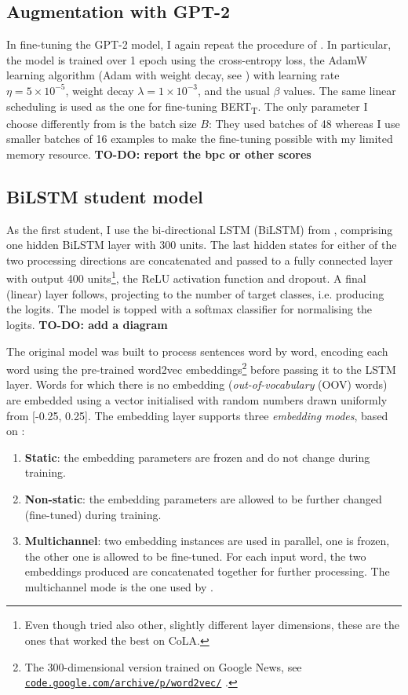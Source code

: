 \documentclass[bsc,frontabs,twoside,singlespacing,parskip,deptreport]{infthesis}
\def\BERTT{BERT\textsubscript{T}}
\newcommand\rurl[1]{%
  \href{https://#1}{\nolinkurl{#1}}%
}
\begin{document}
{{    %
    \subsection{Augmentation with GPT-2}{
      In fine-tuning the GPT-2 model, I again repeat the procedure of \citeauthor{Tang_2019b}. In particular, the model is trained over 1 epoch using the cross-entropy loss, the AdamW learning algorithm (Adam with weight decay, see \citet{Loshchilov_2019}) with learning rate $\eta=5\times10^{-5}$, weight decay $\lambda=1\times10^{-3}$, and the usual $\beta$ values. The same linear scheduling is used as the one for fine-tuning \BERTT. The only parameter I choose differently from \citeauthor{Tang_2019b} is the batch size $B$: They used batches of 48 whereas I use smaller batches of 16 examples to make the fine-tuning possible with my limited memory resource.
      \textbf{TO-DO: report the bpc or other scores}
    }

    \subsection{BiLSTM student model}{
      As the first student, I use the bi-directional LSTM (BiLSTM) from \citeauthor{Tang_2019b}, comprising one hidden BiLSTM layer with 300 units. The last hidden states for either of the two processing directions are concatenated and passed to a fully connected layer with output 400 units\footnote{Even though \citeauthor{Tang_2019b} tried also other, slightly different layer dimensions, these are the ones that worked the best on CoLA.}, the ReLU activation function and dropout. A final (linear) layer follows, projecting to the number of target classes, i.e. producing the logits. The model is topped with a softmax classifier for normalising the logits.
      \textbf{TO-DO: add a diagram}

      The original model was built to process sentences word by word, encoding each word using the pre-trained word2vec embeddings\footnote{The 300-dimensional version trained on Google News, see \rurl{code.google.com/archive/p/word2vec/}.} before passing it to the LSTM layer. Words for which there is no embedding (\textit{out-of-vocabulary} (OOV) words) are embedded using a vector initialised with random numbers drawn uniformly from [-0.25, 0.25]. The embedding layer supports three \textit{embedding modes}, based on \citet{Kim_2014}:
      \begin{enumerate}
        \item \textbf{Static}: the embedding parameters are frozen and do not change during training.
        \item \textbf{Non-static}: the embedding parameters are allowed to be further changed (fine-tuned) during training.
        \item \textbf{Multichannel}: two embedding instances are used in parallel, one is frozen, the other one is allowed to be fine-tuned. For each input word, the two embeddings produced are concatenated together for further processing. The multichannel mode is the one used by \citeauthor{Tang_2019b}.
      \end{enumerate}

}}}
\end{document}
